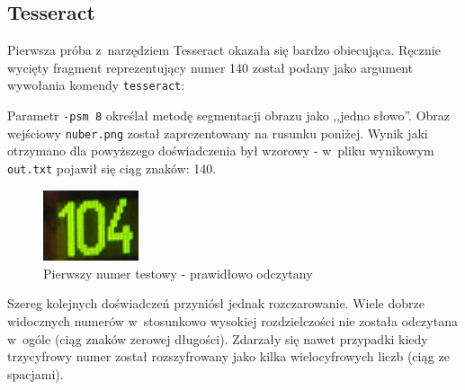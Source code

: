 \subsection{Tesseract}

Pierwsza próba z~narzędziem Tesseract okazała się bardzo obiecująca.
Ręcznie wycięty fragment reprezentujący numer 140 został podany 
jako argument wywołania komendy \verb|tesseract|:



Parametr \verb|-psm 8| określał metodę segmentacji obrazu jako ,,jedno
słowo''. Obraz wejściowy \verb|nuber.png| został zaprezentowany
na rusunku poniżej. Wynik jaki otrzymano dla powyższego doświadczenia
był wzorowy - w~pliku wynikowym \verb|out.txt| pojawił
się ciąg znaków: 140.

\begin{figure}[h!]
    \caption{Pierwszy numer testowy - prawidłowo odczytany}
    \centering
    \includegraphics[width=0.25\textwidth]{img/exp_number_01}
\end{figure}

Szereg kolejnych doświadczeń przyniósł jednak rozczarowanie. 
Wiele dobrze widocznych numerów w~stosunkowo wysokiej rozdzielczości 
nie została odczytana w~ogóle (ciąg znaków zerowej długości). Zdarzały 
się nawet przypadki kiedy trzycyfrowy numer został rozszyfrowany jako
kilka wielocyfrowych liczb (ciąg ze spacjami).


